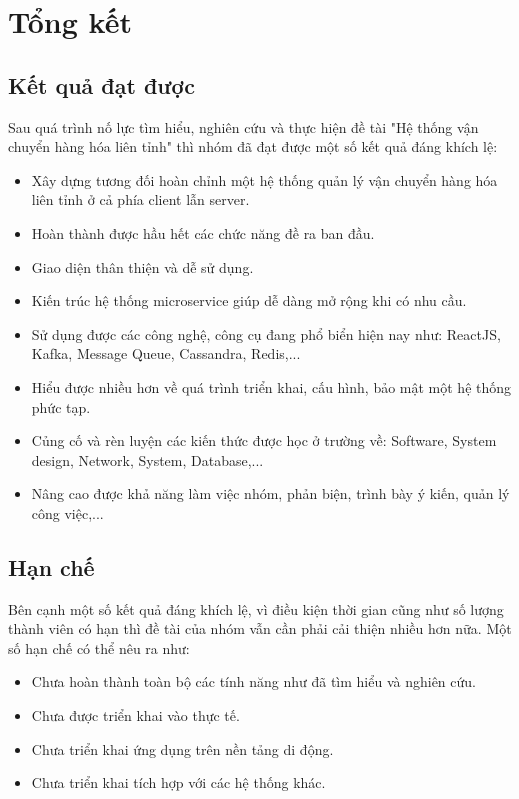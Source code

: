 \chapter{Tổng kết}\label{chap:result}
	\section{Kết quả đạt được}
	Sau quá trình nố lực tìm hiểu, nghiên cứu và thực hiện đề tài "Hệ thống vận chuyển hàng hóa liên tỉnh" thì nhóm đã đạt được một số kết quả đáng khích lệ:
	
	\begin{itemize}
		\item Xây dựng tương đối hoàn chỉnh một hệ thống quản lý vận chuyển hàng hóa liên tỉnh ở cả phía client lẫn server.
		\item Hoàn thành được hầu hết các chức năng đề ra ban đầu.
		\item Giao diện thân thiện và dễ sử dụng.
		\item Kiến trúc hệ thống microservice giúp dễ dàng mở rộng khi có nhu cầu.
		\item Sử dụng được các công nghệ, công cụ đang phổ biển hiện nay như: ReactJS, Kafka, Message Queue, Cassandra, Redis,... 
		\item Hiểu được nhiều hơn về quá trình triển khai, cấu hình, bảo mật một hệ thống phức tạp.
		\item Củng cố và rèn luyện các kiến thức được học ở trường về: Software, System design, Network, System, Database,...
		\item Nâng cao được khả năng làm việc nhóm, phản biện, trình bày ý kiến, quản lý công việc,...
	\end{itemize} 
	
	
	\section{Hạn chế}
	
	Bên cạnh một số kết quả đáng khích lệ, vì điều kiện thời gian cũng như số lượng thành viên có hạn thì đề tài của nhóm vẫn cần phải cải thiện nhiều hơn nữa. Một số hạn chế có thể nêu ra như:


	\begin{itemize}
		\item Chưa hoàn thành toàn bộ các tính năng như đã tìm hiểu và nghiên cứu.
		\item Chưa được triển khai vào thực tế.
		\item Chưa triển khai ứng dụng trên nền tảng di động.
		\item Chưa triển khai tích hợp với các hệ thống khác.
	\end{itemize}
	

